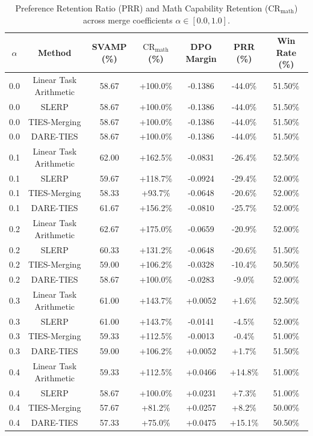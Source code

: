 \begin{table}[t]
\centering
\small
\caption{Preference Retention Ratio (PRR) and Math Capability Retention ($\text{CR}_{\text{math}}$) across merge coefficients $\alpha \in [0.0, 1.0]$.}
\label{tab:table2_merging_full}
\begin{tabular}{ccccccc}
\toprule
$\alpha$ & Method & SVAMP (\%) & $\text{CR}_{\text{math}}$ (\%) & DPO Margin & PRR (\%) & Win Rate (\%) \\
\midrule
0.0 & Linear Task Arithmetic & 58.67 & +100.0\% & -0.1386 & -44.0\% & 51.50\% \\
0.0 & SLERP & 58.67 & +100.0\% & -0.1386 & -44.0\% & 51.50\% \\
0.0 & TIES-Merging & 58.67 & +100.0\% & -0.1386 & -44.0\% & 51.50\% \\
0.0 & DARE-TIES & 58.67 & +100.0\% & -0.1386 & -44.0\% & 51.50\% \\
0.1 & Linear Task Arithmetic & 62.00 & +162.5\% & -0.0831 & -26.4\% & 52.50\% \\
0.1 & SLERP & 59.67 & +118.7\% & -0.0924 & -29.4\% & 52.00\% \\
0.1 & TIES-Merging & 58.33 & +93.7\% & -0.0648 & -20.6\% & 52.00\% \\
0.1 & DARE-TIES & 61.67 & +156.2\% & -0.0810 & -25.7\% & 52.00\% \\
0.2 & Linear Task Arithmetic & 62.67 & +175.0\% & -0.0659 & -20.9\% & 52.00\% \\
0.2 & SLERP & 60.33 & +131.2\% & -0.0648 & -20.6\% & 51.50\% \\
0.2 & TIES-Merging & 59.00 & +106.2\% & -0.0328 & -10.4\% & 50.50\% \\
0.2 & DARE-TIES & 58.67 & +100.0\% & -0.0283 & -9.0\% & 52.00\% \\
0.3 & Linear Task Arithmetic & 61.00 & +143.7\% & +0.0052 & +1.6\% & 52.50\% \\
0.3 & SLERP & 61.00 & +143.7\% & -0.0141 & -4.5\% & 52.00\% \\
0.3 & TIES-Merging & 59.33 & +112.5\% & -0.0013 & -0.4\% & 51.00\% \\
0.3 & DARE-TIES & 59.00 & +106.2\% & +0.0052 & +1.7\% & 51.50\% \\
0.4 & Linear Task Arithmetic & 59.33 & +112.5\% & +0.0466 & +14.8\% & 51.00\% \\
0.4 & SLERP & 58.67 & +100.0\% & +0.0231 & +7.3\% & 51.00\% \\
0.4 & TIES-Merging & 57.67 & +81.2\% & +0.0257 & +8.2\% & 50.00\% \\
0.4 & DARE-TIES & 57.33 & +75.0\% & +0.0475 & +15.1\% & 50.50\% \\

\end{tabular}
\end{table}
